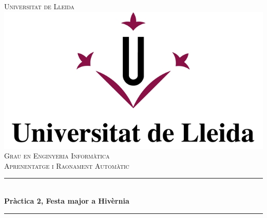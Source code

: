\documentclass[11pt]{article}
\begin{document}
	\begin{titlepage}
		\newcommand{\HRule}{\rule{\linewidth}{0.5mm}} %
		
		\center %
		
		
		\textsc{\LARGE Universitat de Lleida}\\[1.5cm] %
		\includegraphics{Images/LogoUDL.jpg}\\[1cm] %
		\textsc{\Large Grau en Enginyeria Informàtica}\\[0.5cm] %
		\textsc{\large Aprenentatge i Raonament Automàtic}\\[0.5cm] %
		
		
		\HRule \\[0.4cm]
		{ \huge \bfseries Pràctica 2, Festa major a Hivèrnia}\\[0.4cm] %
		\HRule \\[1.5cm] 
		

\end{titlepage}
\end{document}
